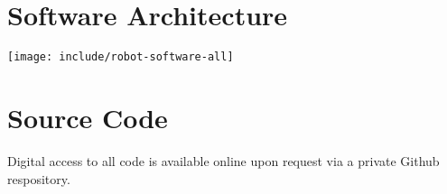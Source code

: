 \documentclass[11pt,twocolumn]{article}
\begin{document}
\appendix
\section{Software Architecture}
\label{sec:robot-graph}
\begin{figure*}
	\centering
	\texttt{[image: include/robot-software-all]}
	\label{fig:robot-software-all}
\end{figure*}

\section{Source Code}
Digital access to all code is available online upon request via a private
Github respository.

\end{document}
